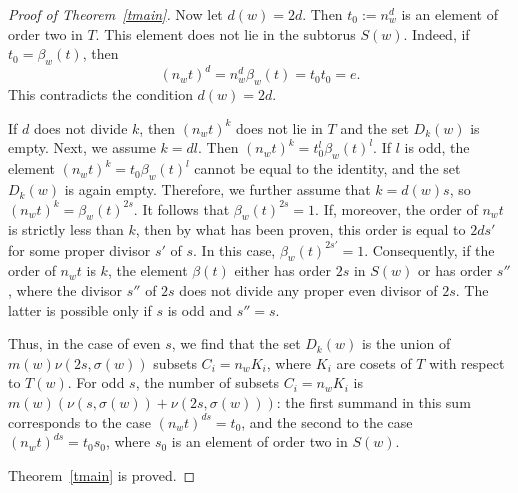 \documentclass[10pt,a4paper]{amsart}
\begin{document}
\begin{proof}[Proof of Theorem~\ref{tmain}]
Now let $d(w)=2d$. Then $t_0:=n_w^d$ is an element of order two in $T$. This element does not lie in the subtorus $S(w)$. Indeed, if $t_0=\beta_w(t)$, then
$$
(n_wt)^d=n_w^d\beta_w(t)=t_0t_0=e.
$$
This contradicts the condition $d(w)=2d$.

If $d$ does not divide $k$, then $(n_wt)^k$ does not lie in $T$ and the set $D_k(w)$ is empty. Next, we assume $k=dl$. Then $(n_wt)^k=t_0^l\beta_w(t)^l$. If $l$ is odd, the element $(n_wt)^k=t_0\beta_w(t)^l$ cannot be equal to the identity, and the set $D_k(w)$ is again empty. Therefore, we further assume that $k=d(w)s$, so $(n_wt)^k=\beta_w(t)^{2s}$.
It follows that $\beta_w(t)^{2s}=1$. If, moreover, the order of $n_wt$ is strictly less than $k$, then by what has been proven, this order is equal to $2ds'$ for some proper divisor $s'$ of $s$. In this case, $\beta_w(t)^{2s'}=1$. Consequently, if the order of $n_wt$ is $k$, the element $\beta(t)$ either has order $2s$ in $S(w)$ or has order $s''$, where the divisor $s''$ of $2s$ does not divide any proper even divisor of $2s$. The latter is possible only if $s$ is odd and $s''=s$.

Thus, in the case of even $s$, we find that the set $D_k(w)$ is the union of $m(w)\nu(2s,\sigma(w))$ subsets $C_i=n_wK_i$, where $K_i$ are cosets of $T$ with respect to $T(w)$. For odd $s$, the number of subsets $C_i=n_wK_i$ is ${m(w)(\nu(s,\sigma(w))+\nu(2s,\sigma(w)))}$: the first summand in this sum corresponds to the case $(n_wt)^{ds}=t_0$, and the second to the case $(n_wt)^{ds}=t_0s_0$, where $s_0$ is an element of order two in $S(w)$.

\smallskip

Theorem~\ref{tmain} is proved.
\end{proof}
\end{document}
